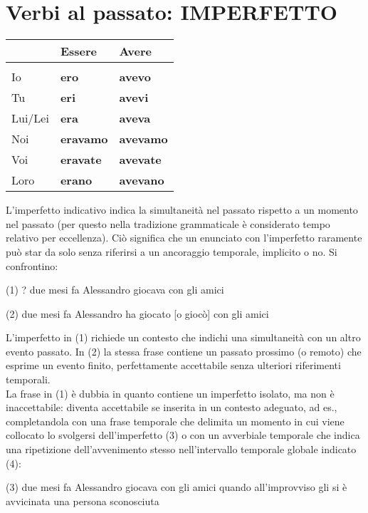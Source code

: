 \documentclass[letter,11pt]{article}
\begin{document}
\vskip 0.2in
\section*{Verbi al passato: IMPERFETTO}
\vskip 0.2in

\begin{tabular}{ |p{2cm}| p{3.5cm}| p{3.5cm}|  }
      & Essere & Avere   \\
    \hline
    \hline
     &  &   \\ \hline
    Io      & {\bf ero} & {\bf avevo}  \\ \hline
    Tu      & {\bf eri} & {\bf avevi} \\ \hline
    Lui/Lei & {\bf era} & {\bf aveva}   \\ \hline
    Noi     & {\bf eravamo} & {\bf avevamo}  \\ \hline
    Voi     & {\bf eravate} & {\bf avevate}  \\ \hline
    Loro    & {\bf erano} & {\bf avevano}   \\ \hline
    \hline
\end{tabular}

\vskip 0.2in

\noindent L’imperfetto indicativo indica la simultaneità nel passato rispetto a un momento nel passato (per questo nella tradizione grammaticale è considerato tempo relativo per eccellenza). Ciò significa che un enunciato con l’imperfetto raramente può star da solo senza riferirsi a un ancoraggio temporale, implicito o no. Si confrontino:

\noindent (1) ? due mesi fa Alessandro giocava con gli amici

\noindent (2) due mesi fa Alessandro ha giocato [o giocò] con gli amici

\noindent L’imperfetto in (1) richiede un contesto che indichi una simultaneità con un altro evento passato. In (2) la stessa frase contiene un passato prossimo (o remoto) che esprime un evento finito, perfettamente accettabile senza ulteriori riferimenti temporali. \\
\noindent La frase in (1) è dubbia in quanto contiene un imperfetto isolato, ma non è inaccettabile: diventa accettabile se inserita in un contesto adeguato, ad es., completandola con una frase temporale che delimita un momento in cui viene collocato lo svolgersi dell’imperfetto (3) o con un avverbiale temporale che indica una ripetizione dell’avvenimento stesso nell’intervallo temporale globale indicato (4):

\noindent (3) due mesi fa Alessandro giocava con gli amici quando all’improvviso gli si è avvicinata una persona sconosciuta
\end{document}

